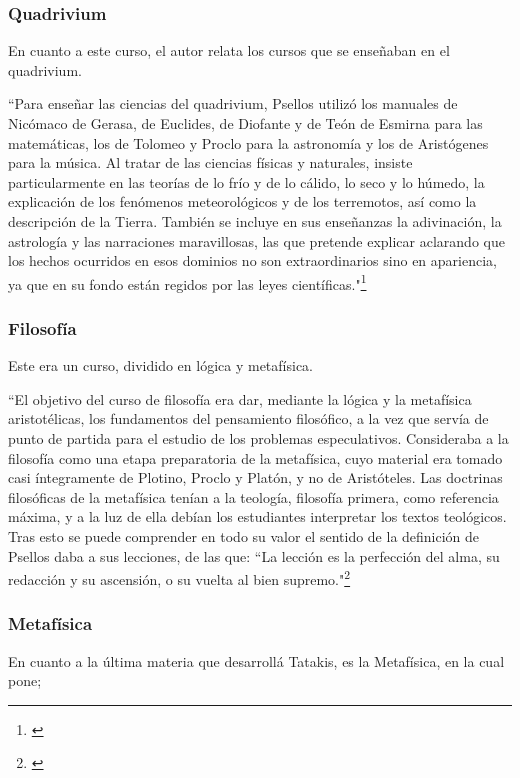 \subsubsection{Quadrivium}
	En cuanto a este curso, el autor relata los cursos que se enseñaban en el quadrivium.

	“Para enseñar las ciencias del quadrivium, Psellos utilizó los manuales de Nicómaco de Gerasa, de Euclides, de Diofante y de Teón de Esmirna para las matemáticas, los de Tolomeo y Proclo para la astronomía y los de Aristógenes para la música. Al tratar de las ciencias físicas y naturales, insiste particularmente en las teorías de lo frío y de lo cálido, lo seco y lo húmedo, la explicación de los fenómenos meteorológicos y de los terremotos, así como la descripción de la Tierra. También se incluye en sus enseñanzas la adivinación, la astrología y las narraciones maravillosas, las que pretende explicar aclarando que los hechos ocurridos en esos dominios no son extraordinarios sino en apariencia, ya que en su fondo están regidos por las leyes científicas."\footnote{\cite[p.~163]{filosofia}}

\subsubsection{Filosofía}
	Este era un curso, dividido en lógica y metafísica.

	“El objetivo del curso de filosofía era dar, mediante la lógica y la metafísica aristotélicas, los fundamentos del pensamiento filosófico, a la vez que servía de punto de partida para el estudio de los problemas especulativos. Consideraba a la filosofía como una etapa preparatoria de la metafísica, cuyo material era tomado casi íntegramente de Plotino, Proclo y Platón, y no de Aristóteles. Las doctrinas filosóficas de la metafísica tenían a la teología, filosofía primera, como referencia máxima, y a la luz de ella debían los estudiantes interpretar los textos teológicos. Tras esto se puede comprender en todo su valor el sentido de la definición de Psellos daba a sus lecciones, de las que: “La lección es la perfección del alma, su redacción y su ascensión, o su vuelta al bien supremo."\footnote{\cite[pp.~164--165]{filosofia}}

\subsubsection{Metafísica}
	En cuanto a la última materia que desarrollá Tatakis, es la Metafísica, en la cual pone;

